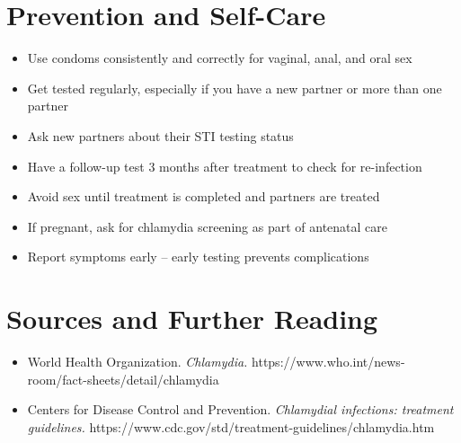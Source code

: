 \section*{Prevention and Self-Care}
\begin{itemize}
    \item Use condoms consistently and correctly for vaginal, anal, and oral sex
    \item Get tested regularly, especially if you have a new partner or more than one partner
    \item Ask new partners about their STI testing status
    \item Have a follow-up test 3 months after treatment to check for re-infection
    \item Avoid sex until treatment is completed and partners are treated
    \item If pregnant, ask for chlamydia screening as part of antenatal care
    \item Report symptoms early -- early testing prevents complications
\end{itemize}

\section*{Sources and Further Reading}
\begin{itemize}
    \item World Health Organization. \textit{Chlamydia.} https://www.who.int/news-room/fact-sheets/detail/chlamydia
    \item Centers for Disease Control and Prevention. \textit{Chlamydial infections: treatment guidelines.} https://www.cdc.gov/std/treatment-guidelines/chlamydia.htm
\end{itemize}
